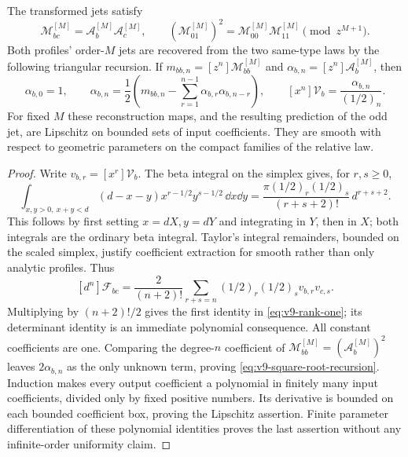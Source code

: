 \begin{theorem}
\label{thm:v9-jet-inverse}
The transformed jets satisfy
\begin{equation}\label{eq:v9-rank-one}
 \mathcal M_{bc}^{[M]}=\mathcal A_b^{[M]}\mathcal A_c^{[M]},
 \qquad
 (\mathcal M_{01}^{[M]})^2
                   =\mathcal M_{00}^{[M]}\mathcal M_{11}^{[M]}
                   \pmod {z^{M+1}}.
\end{equation}
Both profiles' order-$M$ jets are recovered from the two same-type
laws by the following triangular recursion. If
$m_{bb,n}=[z^n]\mathcal M_{bb}^{[M]}$ and
$\alpha_{b,n}=[z^n]\mathcal A_b^{[M]}$, then
\begin{equation}\label{eq:v9-square-root-recursion}
 \alpha_{b,0}=1,\qquad
 \alpha_{b,n}=\frac12\left(m_{bb,n}
       -\sum_{r=1}^{n-1}\alpha_{b,r}\alpha_{b,n-r}\right),
 \qquad [x^n]\mathcal V_b=\frac{\alpha_{b,n}}{(1/2)_n}.
\end{equation}
For fixed $M$ these reconstruction maps, and the resulting prediction
of the odd jet, are Lipschitz on bounded sets of input coefficients.
They are smooth with respect to geometric parameters on the compact
families of the relative law.
\end{theorem}
\begin{proof}
Write $v_{b,r}=[x^r]\mathcal V_b$. The beta integral on the
simplex gives, for $r,s\ge0$,
\[
 \int_{x,y>0,\ x+y<d}(d-x-y)x^{r-1/2}y^{s-1/2}\,\dd x\dd y
       =\frac{\pi(1/2)_r(1/2)_s}{(r+s+2)!}\,d^{r+s+2}.
\]
This follows by first setting $x=dX,y=dY$ and integrating in $Y$,
then in $X$; both integrals are the ordinary beta integral.
Taylor's integral remainders, bounded on the scaled simplex, justify
coefficient extraction for smooth rather than only analytic profiles.
Thus
\begin{equation}\label{eq:v9-beta-coefficients}
 [d^n]\mathcal F_{bc}
       =\frac2{(n+2)!}\sum_{r+s=n}
                    (1/2)_r(1/2)_s v_{b,r}v_{c,s}.
\end{equation}
Multiplying by $(n+2)!/2$ gives the first identity in
\eqref{eq:v9-rank-one}; its determinant identity is an immediate
polynomial consequence. All constant coefficients are one. Comparing
the degree-$n$ coefficient of
$\mathcal M_{bb}^{[M]}=(\mathcal A_b^{[M]})^2$ leaves
$2\alpha_{b,n}$ as the only unknown term, proving
\eqref{eq:v9-square-root-recursion}. Induction makes every output
coefficient a polynomial in finitely many input coefficients, divided
only by fixed positive numbers. Its derivative is bounded on each
bounded coefficient box, proving the Lipschitz assertion. Finite
parameter differentiation of these polynomial identities proves the
last assertion without any infinite-order uniformity claim.
\end{proof}

